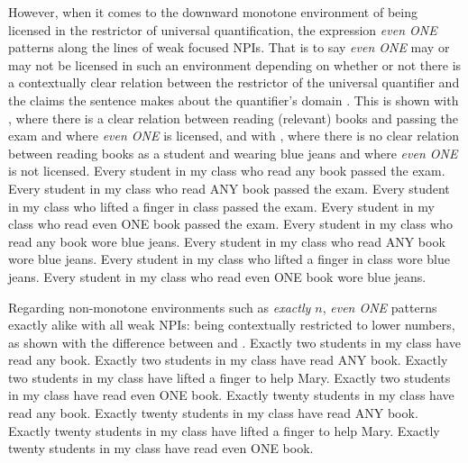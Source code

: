 However, when it comes to the downward monotone environment of being licensed in the restrictor of universal quantification, the expression \textit{even \MakeUppercase{one}} patterns along the lines of weak focused NPIs. That is to say \textit{even \MakeUppercase{one}} may or may not be licensed in such an environment depending on whether or not there is a contextually clear relation between the restrictor of the universal quantifier and the claims the sentence makes about the quantifier's domain \parencite{Crnic2014-dogma}. This is shown with , where there is a clear relation between reading (relevant) books and passing the exam and where \textit{even \MakeUppercase{one}} is licensed, and with , where there is no clear relation between reading books as a student and wearing blue jeans and where \textit{even \MakeUppercase{one}} is not licensed.
\pex[nopreamble=true]\label{ex:even-every-okay}%
\a{} Every student in my class who read any book passed the exam.
\a{} Every student in my class who read \MakeUppercase{any} book passed the exam.
\a{} Every student in my class who lifted a finger in class passed the exam.
\a{} Every student in my class who read even \MakeUppercase{one} book passed the exam.
\xe
\pex[nopreamble=true]\label{ex:even-every-bad}%
\a{} Every student in my class who read any book wore blue jeans.
\a{}\ljudge{\#} Every student in my class who read \MakeUppercase{any} book wore blue jeans.
\a{}\ljudge{\#} Every student in my class who lifted a finger in class wore blue jeans.
\a{}\ljudge{\#} Every student in my class who read even \MakeUppercase{one} book wore blue jeans.
\xe

Regarding non-monotone environments such as \textit{exactly $n$}, \textit{even \MakeUppercase{one}} patterns exactly alike with all weak NPIs: being contextually restricted to lower numbers, as shown with the difference between  and .
\pex[nopreamble=true]\label{ex:even-nm-okay}%
\a{} Exactly two students in my class have read any book.
\a{} Exactly two students in my class have read \MakeUppercase{any} book.
\a{} Exactly two students in my class have lifted a finger to help Mary.
\a{} Exactly two students in my class have read even \MakeUppercase{one} book.
\xe
\pex[nopreamble=true]\label{ex:even-nm-bad}%
\a{}\ljudge{\#} Exactly twenty students in my class have read any book.
\a{}\ljudge{\#} Exactly twenty students in my class have read \MakeUppercase{any} book.
\a{}\ljudge{\#} Exactly twenty students in my class have lifted a finger to help Mary.
\a{}\ljudge{\#} Exactly twenty students in my class have read even \MakeUppercase{one} book.
\xe

